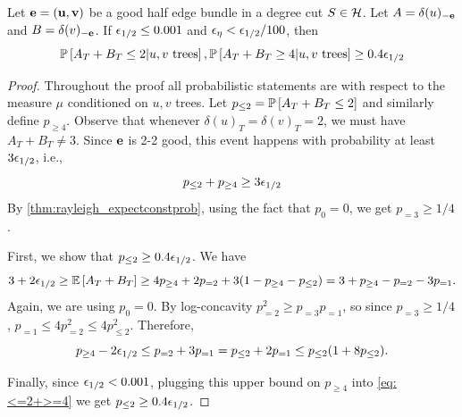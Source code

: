 \begin{lemma}\label{lem:2/2goodEvenSum}
Let $\bbe={\bf (u,v)}$ be a good half edge bundle in a degree cut $S\in\cH$. Let $A=\delta(u)_{-\bbe}$ and $B=\delta(v)_{-\bbe}$.
If $\eps_{1/2}\leq 0.001$ and $\eps_{\eta}<\eps_{1/2}/100$, then
$$ \P{A_T+B_T\leq 2 | u,v\text{ trees}}, \P{A_T + B_T\geq 4 | u,v\text{ trees}} \geq 0.4\eps_{1/2}$$
\end{lemma}
\begin{proof}
Throughout the proof all probabilistic statements are with respect to the measure $\mu$ conditioned on $u,v$ trees.
Let $p_{\leq 2}=\P{A_T+B_T\leq 2}$ and similarly define $p_{\geq 4}$.
Observe that whenever $\delta(u)_T=\delta(v)_T	=2$, we must have $A_T+B_T\neq 3$. Since $\bbe$ is 2-2 good, this event happens with probability at least $3\eps_{1/2}$, i.e., 
\begin{equation}\label{eq:<=2+>=4}
p_{\leq 2}+p_{\geq 4} \geq 3\eps_{1/2}
\end{equation}
By \cref{thm:rayleigh_expectconstprob},
using the fact that $p_0=0$, we get $p_{=3} \ge 1/4$. %



 First, we show that $p_{\leq 2} \geq 0.4\eps_{1/2}$. 
 We have
\begin{eqnarray*}
 3+2\eps_{1/2} \geq  \E{A_T+B_T} \geq 4 p_{\geq 4} + 2 p_{= 2} + 3(1-p_{\geq 4}-p_{\leq 2}) = 3 + p_{\geq 4} - p_{=2} -3p_{ =1}.
\end{eqnarray*}
Again, we are using $p_0=0$.
By log-concavity $p_{=2}^2 \geq p_{=3}p_{=1}$, so
 since $p_{=3}\geq 1/4$, $p_{=1}\leq 4p_{=2}^2\leq 4p_{\leq 2}^2$.
Therefore, 
$$p_{\geq 4}-2\eps_{1/2} \leq   p_{=2}+3p_{= 1} = p_{\leq 2} + 2p_{=1}\leq  p_{\leq 2}(1+8p_{\leq 2}).$$ 

Finally, since $\eps_{1/2}<0.001$, plugging this upper bound on $p_{\ge 4}$ into \cref{eq:<=2+>=4} we get $p_{\leq 2}\geq 0.4\eps_{1/2}$. %


\end{proof}
